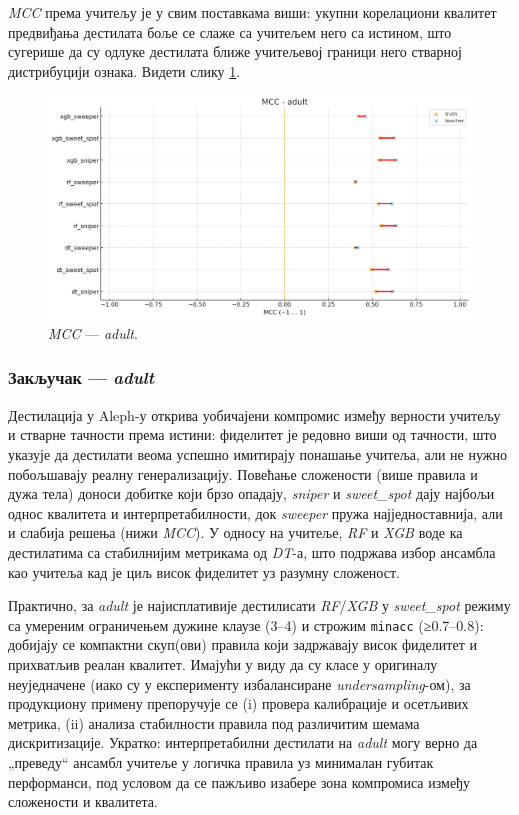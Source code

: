 \textit{MCC} према учитељу је у свим поставкама виши: укупни корелациони квалитет предвиђања дестилата боље се слаже са учитељем него са истином, што сугерише да су одлуке дестилата ближе учитељевој граници него стварној дистрибуцији ознака. Видети слику \ref{fig:adult-mcc-tt}.
\begin{figure}[H]
  \centering
  \includegraphics[width=.85\linewidth]{images/charts/mcc_simple_adult.png}
  \caption{\textit{MCC} — \textit{adult}.}
  \label{fig:adult-mcc-tt}
\end{figure}

\subsubsection*{Закључак — \textit{adult}}
Дестилација у Aleph-у открива уобичајени компромис између верности учитељу и стварне тачности према истини: фиделитет је редовно виши од тачности, што указује да дестилати веома успешно имитирају понашање учитеља, али не нужно побољшавају реалну генерализацију. Повећање сложености (више правила и дужа тела) доноси добитке који брзо опадају, \textit{sniper} и \textit{sweet\_spot} дају најбољи однос квалитета и интерпретабилности, док \textit{sweeper} пружа најједноставнија, али и слабија решења (нижи \textit{MCC}). У односу на учитеље, \textit{RF} и \textit{XGB} воде ка дестилатима са стабилнијим метрикама од \textit{DT}-а, што подржава избор ансамбла као учитеља кад је циљ висок фиделитет уз разумну сложеност.

Практично, за \textit{adult} је најисплативије дестилисати \textit{RF}/\textit{XGB} у \textit{sweet\_spot} режиму са умереним ограничењем дужине клаузе (3–4) и строжим \texttt{minacc} (≥0.7–0.8): добијају се компактни скуп(ови) правила који задржавају висок фиделитет и прихватљив реалан квалитет. Имајући у виду да су класе у оригиналу неуједначене (иако су у експерименту избалансиране \textit{undersampling}-ом), за продукциону примену препоручује се (i) провера калибрације и осетљивих метрика, (ii) анализа стабилности правила под различитим шемама дискритизације. Укратко: интерпретабилни дестилати на \textit{adult} могу верно да „преведу“ ансамбл учитеље у логичка правила уз минималан губитак перформанси, под условом да се пажљиво изабере зона компромиса између сложености и квалитета.

